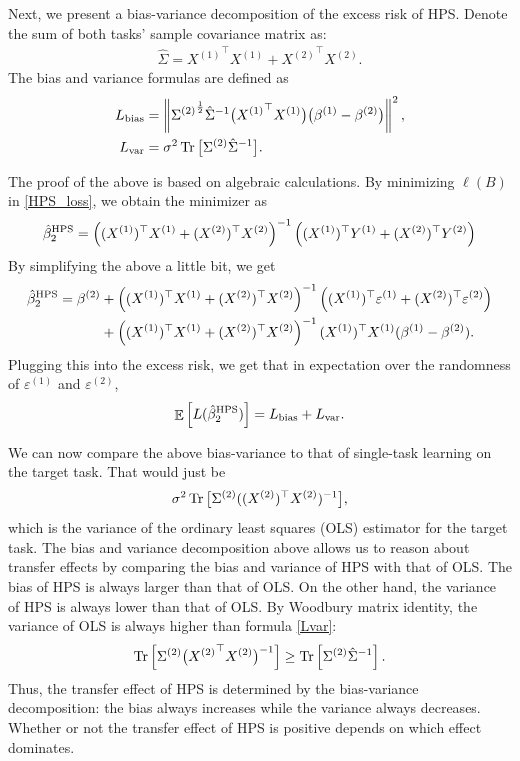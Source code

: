 Next, we present a bias-variance decomposition of the excess risk of HPS.
Denote the sum of both tasks' sample covariance matrix as:
\begin{align}\label{Sigma_a}
    \hat{\Sigma} = {X^{(1)}}^{\top} X^{(1)} + {X^{(2)}}^{\top} X^{(2)}.
\end{align}
The bias and variance formulas are defined as %
\begin{align}
    L_{\textup{bias}}  &= \left\| {\Sigma^{(2)}}^{\frac 1 2}\hat \Sigma^{-1} \big({{X^{(1)}}^\top X^{(1)}}\big) \big(\beta^{(1)}- \beta^{(2)}\big) \right\|^2,  \label{Lbias} \\
    L_{\textup{var}}   &= \sigma^2  \operatorname{Tr}\big[{\Sigma^{(2)}\hat \Sigma^{-1}  }\big].  \label{Lvar}
\end{align}

The proof of the above is based on algebraic calculations.
By minimizing $\ell(B)$ in \eqref{HPS_loss}, we obtain the minimizer as
\[ \hat\beta^{\textup{HPS}}_2 = \left( (X^{(1)})^{\top} X^{(1)} + (X^{(2)})^{\top} X^{(2)} \right)^{-1} 
\left( (X^{(1)})^{\top} Y^{(1)} + (X^{(2)})^{\top} Y^{(2)} \right) \]
By simplifying the above a little bit, we get
\begin{align*}
    \hat\beta^{\textup{HPS}}_2 = \beta^{(2)} &+ \left( (X^{(1)})^{\top} X^{(1)} 
    + (X^{(2)})^{\top} X^{(2)} \right)^{-1} \left( (X^{(1)})^{\top} \varepsilon^{(1)} + (X^{(2)})^{\top} \varepsilon^{(2)} \right) \\
    &+ \left( (X^{(1)})^{\top} X^{(1)} + (X^{(2)})^{\top} X^{(2)} \right)^{-1} (X^{(1)})^{\top} X^{(1)} (\beta^{(1)} - \beta^{(2)}).
\end{align*}
Plugging this into the excess risk, we get that in expectation over the randomness of $\varepsilon^{(1)}$ and $\varepsilon^{(2)}$,
\[ \mathop{\mathbb{E}}\left[ L(\hat{\beta}^{\textup{HPS}}_2) \right] = L_{\textup{bias}} + L_{\textup{var}}. \]

We can now compare the above bias-variance to that of single-task learning on the target task.
That would just be \[ \sigma^{2} \operatorname{Tr}\big[\Sigma^{(2)} ( (X^{(2)})^{\top} X^{(2)} )^{-1} \big], \]
which is the variance of the ordinary least squares (OLS) estimator for the target task.
The bias and variance decomposition above allows us to reason about transfer effects by comparing the bias and variance of HPS with that of OLS.
The bias of HPS is always larger than that of OLS.
On the other hand, the variance of HPS is always lower than that of OLS.
By Woodbury matrix identity, the variance of OLS is always higher than formula \eqref{Lvar}:
\begin{align}
    \operatorname{Tr}\left[\Sigma^{(2)} \big({X^{(2)}}^{\top} X^{(2)}\big)^{-1}\right]
    \ge
    \operatorname{Tr}\left[\Sigma^{(2)} {\hat{\Sigma}}^{-1}\right]. \label{eq_HPS_better}
\end{align}
Thus, the transfer effect of HPS is determined by the bias-variance decomposition: the bias always increases while the variance always decreases.
Whether or not the transfer effect of HPS is positive depends on which effect dominates.

